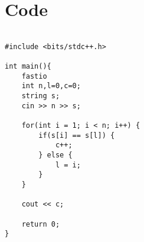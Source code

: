 \documentclass{article}
\begin{document}

\newpage
\section{Code}

\begin{lstlisting}

#include <bits/stdc++.h>

int main(){
    fastio
    int n,l=0,c=0;
    string s;
    cin >> n >> s;

    for(int i = 1; i < n; i++) {
        if(s[i] == s[l]) {
            c++;
        } else {
            l = i;
        }
    }

    cout << c;

    return 0;
}

\end{lstlisting}
\end{document}
